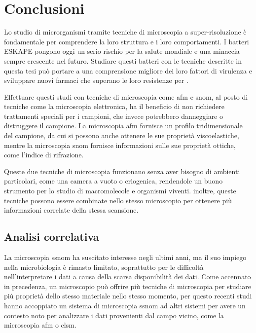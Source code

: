 \documentclass[../main.tex]{subfiles}
\begin{document}
\chapter{Conclusioni}

Lo studio di microrganismi tramite tecniche di microscopia a super-risoluzione è fondamentale per comprendere la loro struttura e i loro comportamenti. I batteri ESKAPE\cite{eskape} pongono oggi un serio rischio per la salute mondiale\cite{rice_2008} e una minaccia sempre crescente nel futuro.\cite{pipito_2025} Studiare questi batteri con le tecniche descritte in questa tesi può portare a una comprensione migliore dei loro fattori di virulenza e sviluppare nuovi farmaci che superano le loro resistenze per .

Effettuare questi studi con tecniche di microscopia come \acrshort{afm} e \acrshort{snom}, al posto di tecniche come la microscopia elettronica, ha il beneficio di non richiedere trattamenti speciali per i campioni, che invece potrebbero danneggiare o distruggere il campione. La microscopia \acrshort{afm} fornisce un profilo tridimensionale del campione, da cui si possono anche ottenere le sue proprietà viscoelastiche, mentre la microscopia \acrshort{snom} fornisce informazioni sulle sue proprietà ottiche, come l'indice di rifrazione.

Queste due tecniche di microscopia funzionano senza aver bisogno di ambienti particolari, come una camera a vuoto o criogenica, rendendole un buono strumento per lo studio di macromolecole e organismi viventi. inoltre, queste tecniche possono essere combinate nello stesso microscopio per ottenere più informazioni correlate della stessa scansione.

\section{Analisi correlativa}
La microscopia \acrshort{ssnom} ha suscitato interesse negli ultimi anni, ma il suo impiego nella \gls{microbiologia} è rimasto limitato, soprattutto per le difficoltà nell'interpretare i dati a causa della scarsa disponibilità dei dati. Come accennato in precedenza, un microscopio può offrire più tecniche di microscopia per studiare più proprietà dello stesso materiale nello stesso momento, per questo recenti studi hanno accoppiato un sistema di microscopia \acrshort{ssnom} ad altri sistemi per avere un contesto noto per analizzare i dati provenienti dal campo vicino, come la microscopia \acrfull{afm} o \acrshort{clsm}.\cite{stanciu_2017}\\
\end{document}
